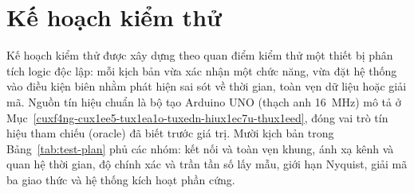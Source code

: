 \section{Kế hoạch kiểm thử}\label{sec:test-plan}

Kế hoạch kiểm thử được xây dựng theo quan điểm kiểm thử một thiết bị phân tích logic độc lập: mỗi kịch bản vừa xác nhận một chức năng, vừa đặt hệ thống vào điều kiện biên nhằm phát hiện sai sót về thời gian, toàn vẹn dữ liệu hoặc giải mã. Nguồn tín hiệu chuẩn là bộ tạo Arduino UNO (thạch anh 16~MHz) mô tả ở Mục~\ref{cuxf4ng-cux1ee5-tux1ea1o-tuxedn-hiux1ec7u-thux1eed}, đóng vai trò tín hiệu tham chiếu (oracle) đã biết trước giá trị. Mười kịch bản trong Bảng~\ref{tab:test-plan} phủ các nhóm: kết nối và toàn vẹn khung, ánh xạ kênh và quan hệ thời gian, độ chính xác và trần tần số lấy mẫu, giới hạn Nyquist, giải mã ba giao thức và hệ thống kích hoạt phần cứng.

